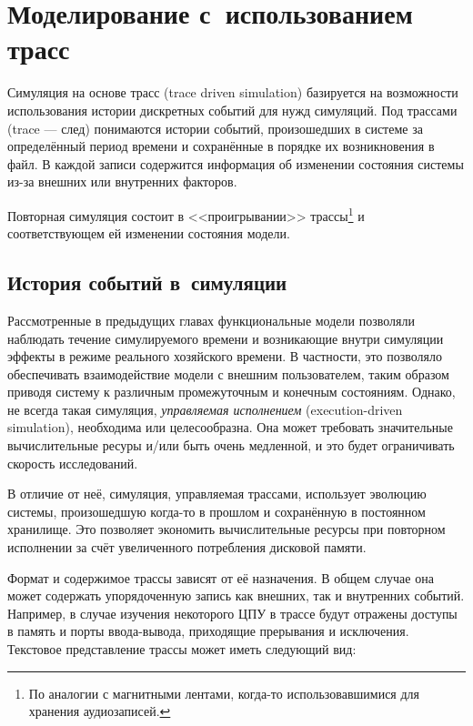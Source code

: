 \chapter{Моделирование с~использованием трасс}\label{chapter05}


Симуляция на основе трасс (\abbr trace driven simulation) базируется на возможности использования истории дискретных событий для нужд симуляций. Под трассами (\abbr trace --- след) понимаются истории событий, произошедших в системе за определённый период времени и сохранённые в порядке их возникновения в файл. В каждой записи содержится информация об изменении состояния системы из-за внешних или внутренних факторов. 

Повторная симуляция состоит в <<проигрывании>> трассы\footnote{По аналогии с магнитными лентами, когда-то использовавшимися для хранения аудиозаписей.} и соответствующем ей изменении состояния модели.

\section{История событий в~симуляции}

Рассмотренные в предыдущих главах функциональные модели позволяли наблюдать течение симулируемого времени и возникающие внутри симуляции эффекты в режиме реального хозяйского времени. В частности, это позволяло обеспечивать взаимодействие модели с внешним  пользователем, таким образом приводя систему к различным промежуточным и конечным состояниям. Однако, не всегда такая симуляция, \textit{управляемая исполнением} (\abbr execution-driven simulation), необходима или целесообразна. Она может требовать значительные вычислительные ресуры и/или быть очень медленной, и это будет ограничивать скорость исследований.

В отличие от неё, симуляция, управляемая трассами, использует эволюцию системы, произошедшую когда-то в прошлом и сохранённую в постоянном хранилище. Это позволяет экономить вычислительные ресурсы при повторном исполнении за счёт увеличенного потребления дисковой памяти.

Формат и содержимое трассы зависят от её назначения. В общем случае она может содержать упорядоченную запись как внешних, так и внутренних событий. Например, в случае изучения некоторого ЦПУ в трассе будут отражены доступы в память и порты ввода-вывода, приходящие прерывания и исключения. Текстовое представление трассы может иметь следующий вид:

